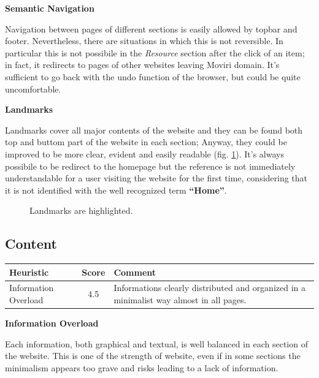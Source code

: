 \textbf{Semantic Navigation}\par
Navigation between pages of different sections is easily allowed by topbar and footer. Nevertheless, there are situations in which this is not reversible. In particular this is not possibile in the \textit{Resource} section after the click of an item; in fact, it redirects to pages of other websites leaving Moviri domain. It's sufficient to go back with the undo function of the browser, but could be quite uncomfortable.
\medskip

\textbf{Landmarks}\par
Landmarks cover all major contents of the website and they can be found both top and buttom part of the website in each section; Anyway, they could be improved to be more clear, evident and easily readable (fig. \ref{landmarks}). It’s always possibile to be redirect to the homepage but the reference is not immediately understandable for a user visiting the website for the first time, considering that it is not identified with the well recognized term \textbf{“Home”}.

\begin{figure}[H]
  \centering
        \caption{Landmarks are highlighted.}
\label{landmarks}
\end{figure}

\subsection{Content}
\begin{table}[H]
  \begin{center}
    \label{tab:table1}
    \begin{tabular}{||l|c|p{8cm}||} %
      \textbf{Heuristic} & \textbf{Score} & \textbf{Comment}\\
      
      \hline
     Information Overload & 4.5 & Informations clearly distributed and organized in a minimalist way almost in all pages.\\
     
    \end{tabular}
  \end{center}
\end{table}
\medskip
\textbf{Information Overload}\par
Each information, both graphical and textual, is well balanced in each section of the website. This is one of the strength of website, even if in some sections the minimalism appears too grave and risks leading to a lack of information.

